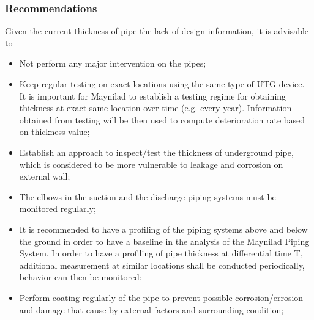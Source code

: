 \subsubsection{Recommendations}
Given the current thickness of pipe the lack of design information, it is advisable to 
\begin{itemize}
\item Not perform any major intervention on the pipes;
\item Keep regular testing on exact locations using the same type of UTG device. It is important for Maynilad to establish a testing regime for obtaining thickness at exact same location over time (e.g. every year). Information obtained from testing will be then used to compute deterioration rate based on thickness value;
\item Establish an approach to inspect/test the thickness of underground pipe, which is considered to be more vulnerable to leakage and corrosion on external wall;
\item The elbows in the suction and the discharge piping systems must be monitored regularly;
\item It is recommended to have a profiling of the piping systems above and below the ground in order to have a baseline in the analysis of the Maynilad Piping System. In order to have a profiling of pipe thickness at differential time T, additional measurement at similar locations shall be conducted periodically, behavior can then be monitored;
\item Perform coating regularly of the pipe to prevent possible corrosion/errosion and damage that cause by external factors and surrounding condition;
\end{itemize}
%